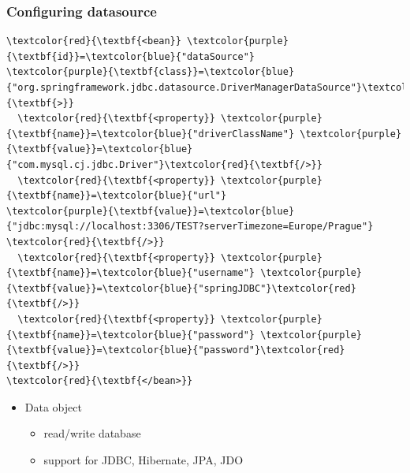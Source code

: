 \documentclass[10pt,xcolor=pdflatex, table]{beamer}
\begin{document}
\begin{frame}[fragile]\frametitle{Configuring datasource}
	\begin{Verbatim}[fontsize=\footnotesize, commandchars=\\\{\}]
\textcolor{red}{\textbf{<bean}} \textcolor{purple}{\textbf{id}}=\textcolor{blue}{"dataSource"}
\textcolor{purple}{\textbf{class}}=\textcolor{blue}{"org.springframework.jdbc.datasource.DriverManagerDataSource"}\textcolor{red}{\textbf{>}}
  \textcolor{red}{\textbf{<property}} \textcolor{purple}{\textbf{name}}=\textcolor{blue}{"driverClassName"} \textcolor{purple}{\textbf{value}}=\textcolor{blue}{"com.mysql.cj.jdbc.Driver"}\textcolor{red}{\textbf{/>}}
  \textcolor{red}{\textbf{<property}} \textcolor{purple}{\textbf{name}}=\textcolor{blue}{"url"}
\textcolor{purple}{\textbf{value}}=\textcolor{blue}{"jdbc:mysql://localhost:3306/TEST?serverTimezone=Europe/Prague"}
\textcolor{red}{\textbf{/>}}
  \textcolor{red}{\textbf{<property}} \textcolor{purple}{\textbf{name}}=\textcolor{blue}{"username"} \textcolor{purple}{\textbf{value}}=\textcolor{blue}{"springJDBC"}\textcolor{red}{\textbf{/>}}
  \textcolor{red}{\textbf{<property}} \textcolor{purple}{\textbf{name}}=\textcolor{blue}{"password"} \textcolor{purple}{\textbf{value}}=\textcolor{blue}{"password"}\textcolor{red}{\textbf{/>}}
\textcolor{red}{\textbf{</bean>}}
	\end{Verbatim}
    \begin{itemize}
    	\item Data object
        \begin{itemize}
        	\item read/write database
        	\item support for JDBC, Hibernate, JPA, JDO
        \end{itemize}
    \end{itemize}
\end{frame}
\end{document}
